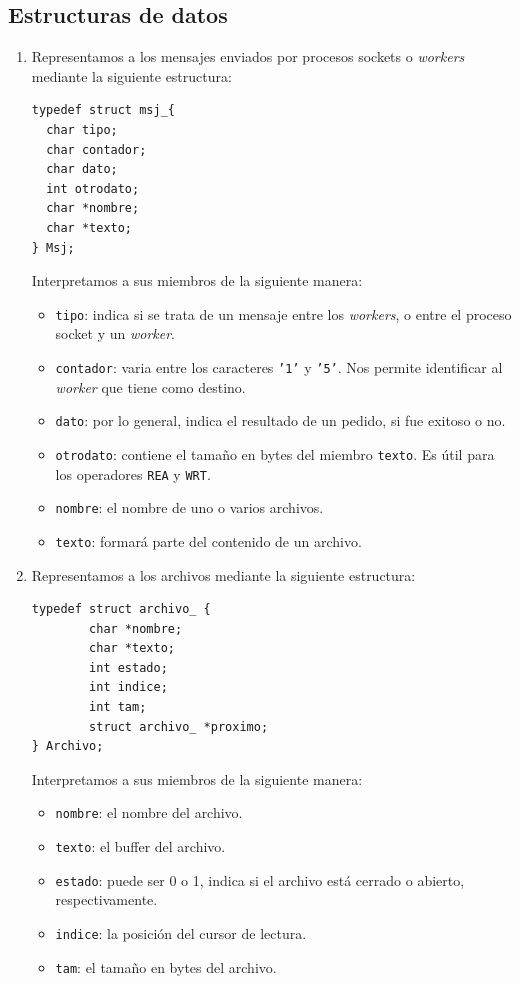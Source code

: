 \documentclass[a4paper, 8pt]{article}
\begin{document}
\subsection{Estructuras de datos}
\begin{enumerate}
\item Representamos a los mensajes enviados por procesos sockets o \textit{workers} mediante la siguiente estructura:
\begin{verbatim}
typedef struct msj_{
  char tipo;
  char contador;
  char dato;
  int otrodato;
  char *nombre;
  char *texto;
} Msj;
\end{verbatim}

\newpage
Interpretamos a sus miembros de la siguiente manera:

\begin{itemize}
  \item \texttt{tipo}: indica si se trata de un mensaje entre los \textit{workers}, o entre el proceso socket y un \textit{worker}.
  \item \texttt{contador}: varia entre los caracteres \texttt{'1'} y \texttt{'5'}. Nos permite identificar al \textit{worker} que tiene como destino.
  \item \texttt{dato}: por lo general, indica el resultado de un pedido, si fue exitoso o no.
  \item \texttt{otrodato}: contiene el tamaño en bytes del miembro \texttt{texto}. Es útil para los operadores \texttt{REA} y \texttt{WRT}.
  \item \texttt{nombre}: el nombre de uno o varios archivos.
  \item \texttt{texto}: formará parte del contenido de un archivo.
\end{itemize}

\item Representamos a los archivos mediante la siguiente estructura:

\begin{verbatim}
typedef struct archivo_ {
	    char *nombre;
	    char *texto;
	    int estado;
	    int indice;
	    int tam;
	    struct archivo_ *proximo;
} Archivo;
\end{verbatim}

Interpretamos a sus miembros de la siguiente manera:

\begin{itemize}
  \item \texttt{nombre}: el nombre del archivo.
  \item \texttt{texto}: el buffer del archivo.
  \item \texttt{estado}: puede ser 0 o 1, indica si el archivo está cerrado o abierto, respectivamente.
  \item \texttt{indice}: la posición del cursor de lectura.
  \item \texttt{tam}: el tamaño en bytes del archivo.
\end{itemize}

\end{enumerate}
\end{document}
